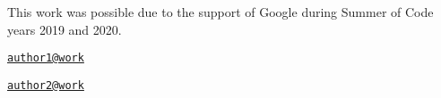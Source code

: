 This work was possible due to the support of Google during Summer of
Code years 2019 and 2020.




\address{%
Author One\\
Affiliation\\
line 1\\ line 2\\
}
\href{mailto:author1@work}{\nolinkurl{author1@work}}

\address{%
Author Two\\
Affiliation\\
line 1\\ line 2\\
}
\href{mailto:author2@work}{\nolinkurl{author2@work}}

